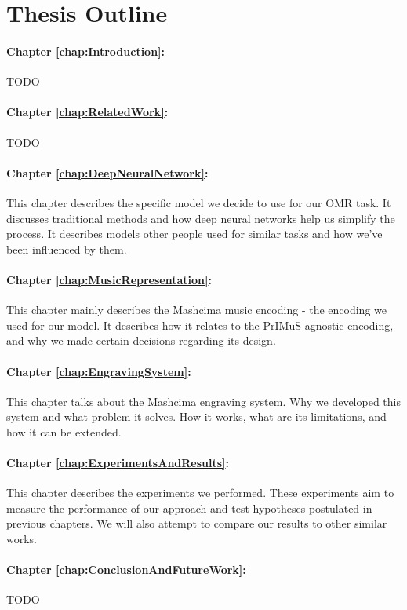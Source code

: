\section{Thesis Outline}

\paragraph{Chapter \ref{chap:Introduction}:} TODO

\paragraph{Chapter \ref{chap:RelatedWork}:} TODO

\paragraph{Chapter \ref{chap:DeepNeuralNetwork}:} This chapter describes the specific model we decide to use for our OMR task. It discusses traditional methods and how deep neural networks help us simplify the process. It describes models other people used for similar tasks and how we've been influenced by them.

\paragraph{Chapter \ref{chap:MusicRepresentation}:} This chapter mainly describes the Mashcima music encoding - the encoding we used for our model. It describes how it relates to the PrIMuS agnostic encoding, and why we made certain decisions regarding its design.

\paragraph{Chapter \ref{chap:EngravingSystem}:} This chapter talks about the Mashcima engraving system. Why we developed this system and what problem it solves. How it works, what are its limitations, and how it can be extended.

\paragraph{Chapter \ref{chap:ExperimentsAndResults}:} This chapter describes the experiments we performed. These experiments aim to measure the performance of our approach and test hypotheses postulated in previous chapters. We will also attempt to compare our results to other similar works.

\paragraph{Chapter \ref{chap:ConclusionAndFutureWork}:} TODO
